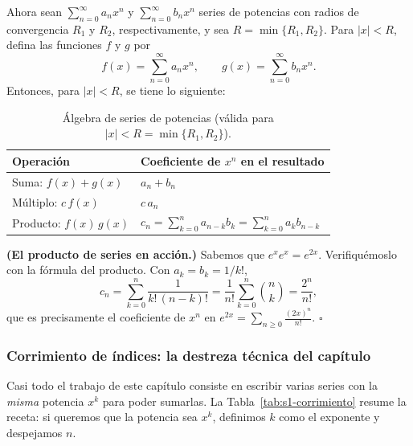 Ahora sean $\sum_{n=0}^{\infty} a_n x^n$ y $\sum_{n=0}^{\infty} b_n x^n$ series de potencias con radios de convergencia $R_1$ y $R_2$, respectivamente, y sea $R = \min\{R_1, R_2\}$. Para $|x| < R$, defina las funciones $f$ y $g$ por
\[ f(x) = \sum_{n=0}^{\infty} a_n x^n, \qquad g(x) = \sum_{n=0}^{\infty} b_n x^n. \]
Entonces, para $|x| < R$, se tiene lo siguiente:
 
\begin{table}[H]
\centering
\small
\caption{Álgebra de series de potencias (válida para $|x|<R=\min\{R_1,R_2\}$).}
\label{tab:s1-operaciones}
\begin{tabular}{|l|l|}
\hline
\rowcolor{bbe!15}\textbf{Operación} & \textbf{Coeficiente de $x^n$ en el resultado} \\ \hline
Suma: $f(x)+g(x)$ & $a_n+b_n$ \\ \hline
Múltiplo: $c\,f(x)$ & $c\,a_n$ \\ \hline
Producto: $f(x)\,g(x)$ & $c_n=\displaystyle\sum_{k=0}^{n} a_{n-k}b_k=\sum_{k=0}^{n} a_k b_{n-k}$ \\ \hline
\end{tabular}
\end{table}
 
\begin{example}
\textbf{(El producto de series en acción.)} Sabemos que $e^x e^x=e^{2x}$. Verifiquémoslo con la fórmula del producto. Con $a_k=b_k=1/k!$,
\[ c_n=\sum_{k=0}^{n}\frac{1}{k!\,(n-k)!}=\frac{1}{n!}\sum_{k=0}^{n}\binom{n}{k}=\frac{2^n}{n!}, \]
que es precisamente el coeficiente de $x^n$ en $e^{2x}=\sum_{n\ge 0} \frac{(2x)^n}{n!}$. \hfill $\square$
\end{example}
 
\subsubsection*{Corrimiento de índices: la destreza técnica del capítulo}
 
Casi todo el trabajo de este capítulo consiste en escribir varias series con la \emph{misma} potencia $x^k$ para poder sumarlas. La Tabla~\ref{tab:s1-corrimiento} resume la receta: si queremos que la potencia sea $x^k$, definimos $k$ como el exponente y despejamos $n$.
 
